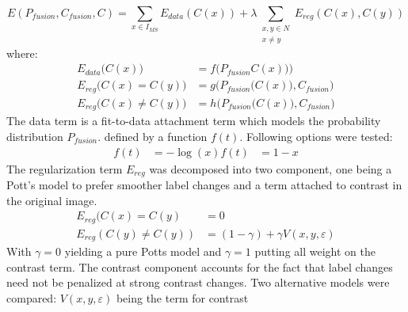 \documentclass[10pt]{article}
\begin{document}
\[E(P_{fusion},C_{fusion},C)=\sum_{x\in I_{MS}}E_{data}(C(x))+\lambda\sum _{\substack{x,y\in N\\x\neq y}}E_{reg}(C(x),C(y)) \]
where:
\begin{align}
E_{data}\big(C(x)\big)&=f\Big(P_{fusion}C(x)\big)\Big)\\
E_{reg}\big(C(x)=C(y)\big)&=g\Big(P_{fusion}\big(C(x)\big),C_{fusion}\Big)\\
E_{reg}\big(C(x)\neq C(y)\big)&=h\Big(P_{fusion}\big(C(x)\big),C_{fusion}\Big)
\end{align}
The data term is a fit-to-data attachment term which models the probability distribution $P_{fusion}$. defined by a function $f(t)$. Following options were tested:
\begin{align}
f(t)&=-\log(x)
f(t)&=1-x
\end{align}
The regularization term $E_{reg}$ was decomposed into two component, one being a Pott's model to prefer smoother label changes and a term attached to contrast in the original image.
\begin{align}
    E_{reg}(C(x)=C(y)&=0\\ 
    E_{reg}(C(y)\neq C(y))&=(1-\gamma)+\gamma V(x,y,\varepsilon)
\end{align}
With $\gamma = 0$ yielding a pure Potts model and $\gamma = 1$ putting all weight on the contrast term. The contrast component accounts for the fact that label changes need not be penalized at strong contrast changes. Two alternative models were compared:
$V(x,y,\varepsilon)$ being the term for contrast
\end{document}
